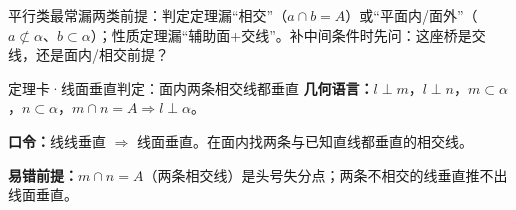 \documentclass{exam-zh}
\begin{document}
\begin{eduDualExplain}
  \begin{eduExplainLeft}
  \end{eduExplainLeft}

  \begin{eduExplainRight}
  \end{eduExplainRight}
\end{eduDualExplain}




\begin{eduMistakeBox}
平行类最常漏两类前提：判定定理漏“相交”（$a\cap b=A$）或“平面内/面外”（$a\not\subset\alpha$、$b\subset\alpha$）；性质定理漏“辅助面+交线”。补中间条件时先问：这座桥是交线，还是面内/相交前提？\end{eduMistakeBox}



\clearpage
{}


\begin{eduSolutionBox}{定理卡·线面垂直判定：面内两条相交线都垂直}
  \begingroup
  \setlength{\parskip}{2.5mm}
\textbf{几何语言：}$l\perp m$，$l\perp n$，$m\subset\alpha$，$n\subset\alpha$，$m\cap n=A\Rightarrow l\perp\alpha$。\par
\textbf{口令：}线线垂直 $\Rightarrow$ 线面垂直。在面内找两条与已知直线都垂直的相交线。\par
\textbf{易错前提：}$m\cap n=A$（两条相交线）是头号失分点；两条不相交的线垂直推不出线面垂直。\par
  \endgroup
\end{eduSolutionBox}
\end{document}
